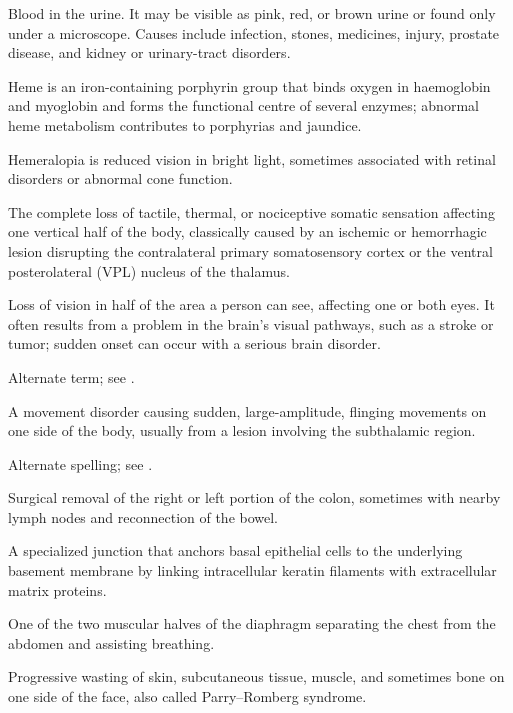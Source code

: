  Blood in the urine. It may be visible as pink, red, or brown urine or found only under a microscope. Causes include infection, stones, medicines, injury, prostate disease, and kidney or urinary-tract disorders.

 Heme is an iron-containing porphyrin group that binds oxygen in haemoglobin and myoglobin and forms the functional centre of several enzymes; abnormal heme metabolism contributes to porphyrias and jaundice.

 Hemeralopia is reduced vision in bright light, sometimes associated with retinal disorders or abnormal cone function.

 The complete loss of tactile, thermal, or nociceptive somatic sensation affecting one vertical half of the body, classically caused by an ischemic or hemorrhagic lesion disrupting the contralateral primary somatosensory cortex or the ventral posterolateral (VPL) nucleus of the thalamus.

 Loss of vision in half of the area a person can see, affecting one or both eyes. It often results from a problem in the brain’s visual pathways, such as a stroke or tumor; sudden onset can occur with a serious brain disorder.

 Alternate term; see .

 A movement disorder causing sudden, large-amplitude, flinging movements on one side of the body, usually from a lesion involving the subthalamic region.

 Alternate spelling; see .

 Surgical removal of the right or left portion of the colon, sometimes with nearby lymph nodes and reconnection of the bowel.

 A specialized junction that anchors basal epithelial cells to the underlying basement membrane by linking intracellular keratin filaments with extracellular matrix proteins.

 One of the two muscular halves of the diaphragm separating the chest from the abdomen and assisting breathing.

 Progressive wasting of skin, subcutaneous tissue, muscle, and sometimes bone on one side of the face, also called Parry--Romberg syndrome.

